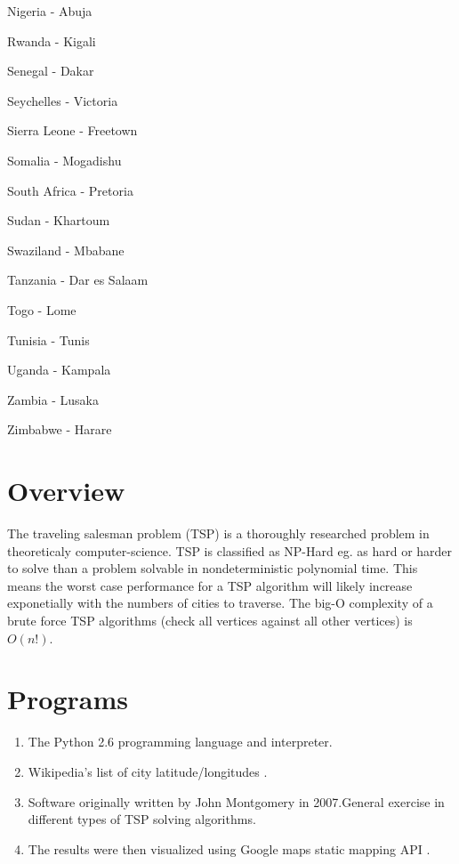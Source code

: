 \documentclass[12pt]{article}
\begin{document}
\begin{multicols}{3}
\begin{enumerate*}
\item Nigeria - Abuja
\item Rwanda - Kigali
\item Senegal - Dakar
\item Seychelles - Victoria
\item Sierra Leone - Freetown
\item Somalia - Mogadishu
\item South Africa - Pretoria
\item Sudan - Khartoum
\item Swaziland - Mbabane
\item Tanzania - Dar es Salaam
\item Togo - Lome
\item Tunisia - Tunis
\item Uganda - Kampala
\item Zambia - Lusaka
\item Zimbabwe - Harare
\end{enumerate*}
\end{multicols}

\section{Overview}

  The traveling salesman problem (TSP) is a thoroughly researched problem in theoreticaly computer-science. 
TSP is classified as NP-Hard eg. as hard or harder to solve than a problem solvable in nondeterministic polynomial time.
This means the worst case performance for a TSP algorithm will likely increase exponetially with the numbers of cities to traverse.
The big-O complexity of a brute force TSP algorithms (check all vertices against all other vertices) is $O(n!)$.

\section{Programs}

\begin{enumerate}
\item The Python 2.6 \cite{python} programming language and interpreter.
\item Wikipedia's list of city latitude/longitudes \cite{wiki}.
\item Software originally written by John Montgomery \cite{tsp} in 2007.General exercise in different types of TSP solving algorithms.
\item The results were then visualized using Google maps static mapping API \cite{google}.

\end{enumerate}
\end{document}
